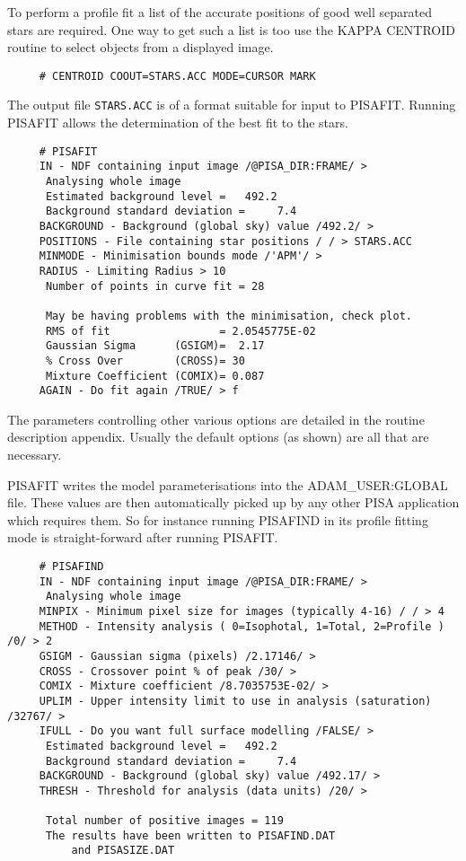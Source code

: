 To perform a profile fit a list of the accurate positions of good well
separated stars are required. One way to get such a list is too use the
KAPPA CENTROID routine to select objects from a displayed image.
\begin{verbatim}
     # CENTROID COOUT=STARS.ACC MODE=CURSOR MARK
\end{verbatim}
The output file \verb+STARS.ACC+ is of a format suitable for input to
PISAFIT. Running PISAFIT allows the determination of the best fit to the
stars.
\begin{verbatim}
     # PISAFIT
     IN - NDF containing input image /@PISA_DIR:FRAME/ >
      Analysing whole image
      Estimated background level =   492.2
      Background standard deviation =     7.4
     BACKGROUND - Background (global sky) value /492.2/ > 
     POSITIONS - File containing star positions / / > STARS.ACC
     MINMODE - Minimisation bounds mode /'APM'/ >
     RADIUS - Limiting Radius > 10
      Number of points in curve fit = 28

      May be having problems with the minimisation, check plot.
      RMS of fit                 = 2.0545775E-02
      Gaussian Sigma      (GSIGM)=  2.17
      % Cross Over        (CROSS)= 30
      Mixture Coefficient (COMIX)= 0.087
     AGAIN - Do fit again /TRUE/ > f

\end{verbatim}
The parameters controlling other various options are detailed in the
routine description appendix. Usually the default options (as shown) are
all that are necessary.

PISAFIT writes the model parameterisations into the ADAM\_USER:GLOBAL
file. These values are then automatically picked up by any other PISA
application which requires them. So for instance running PISAFIND in its
profile fitting mode is straight-forward after running PISAFIT.
\begin{verbatim}
     # PISAFIND
     IN - NDF containing input image /@PISA_DIR:FRAME/ >
      Analysing whole image
     MINPIX - Minimum pixel size for images (typically 4-16) / / > 4
     METHOD - Intensity analysis ( 0=Isophotal, 1=Total, 2=Profile ) /0/ > 2
     GSIGM - Gaussian sigma (pixels) /2.17146/ >
     CROSS - Crossover point % of peak /30/ >
     COMIX - Mixture coefficient /8.7035753E-02/ >
     UPLIM - Upper intensity limit to use in analysis (saturation) /32767/ >
     IFULL - Do you want full surface modelling /FALSE/ >
      Estimated background level =   492.2
      Background standard deviation =     7.4
     BACKGROUND - Background (global sky) value /492.17/ >
     THRESH - Threshold for analysis (data units) /20/ >

      Total number of positive images = 119
      The results have been written to PISAFIND.DAT
          and PISASIZE.DAT
\end{verbatim}

